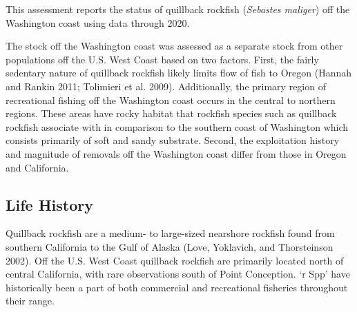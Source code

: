 \documentclass[11pt,
  english,
  a4paper,
]{article}
\begin{document}
\leavevmode\tagmcend\tagstructend


This assessment reports the status of quillback rockfish (\emph{Sebastes maliger}) off the Washington coast using data through 2020.

\leavevmode\tagmcend\tagstructend\par


The stock off the Washington coast was assessed as a separate stock from other populations off the U.S. West Coast based on two factors. First, the fairly sedentary nature of quillback rockfish likely limits flow of fish to Oregon {(Hannah and Rankin 2011; Tolimieri et al. 2009)\leavevmode\tagmcend\tagstructend}. Additionally, the primary region of recreational fishing off the Washington coast occurs in the central to northern regions. These areas have rocky habitat that rockfish species such as quillback rockfish associate with in comparison to the southern coast of Washington which consists primarily of soft and sandy substrate. Second, the exploitation history and magnitude of removals off the Washington coast differ from those in Oregon and California.

\leavevmode\tagmcend\tagstructend\par


\hypertarget{life-history}{%
\subsection{Life History}\label{life-history}}

\leavevmode\tagmcend\tagstructend


Quillback rockfish are a medium- to large-sized nearshore rockfish found from southern California to the Gulf of Alaska {(Love, Yoklavich, and Thorsteinson 2002)\leavevmode\tagmcend\tagstructend}. Off the U.S. West Coast quillback rockfish are primarily located north of central California, with rare observations south of Point Conception. `r Spp' have historically been a part of both commercial and recreational fisheries throughout their range.

\leavevmode\tagmcend\tagstructend\par
\end{document}
